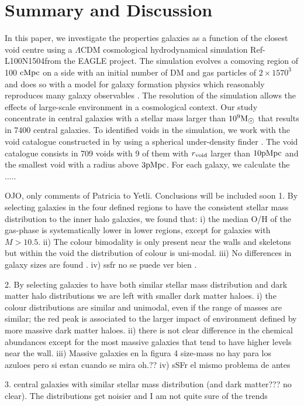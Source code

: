 \documentclass[a4paper,fleqn,usenatbib,letter]{mnras}
\newcommand{\Msun}{\rm M_{\sun}}
\newcommand{\pMpc}{\rm pMpc}
\newcommand{\REF}{Ref-L100N1504}
\newcommand{\Rvoid}{r_{\rm void} }
\begin{document}
\section{ Summary and Discussion}
In this paper, we investigate the properties galaxies as a function of the closest void centre using a  $\Lambda$CDM  cosmological hydrodynamical simulation \REF from the EAGLE project.  The simulation evolves a comoving region of 100 $\rm cMpc$ on a side with  an initial number of  DM and gas  particles  of $2\times 1570^3$ and does so with a model for galaxy formation physics which reasonably reproduces  many galaxy observables \citep{schaye2015,crain2015,furlong2015}.  
The resolution of the simulation allows the effects of large-scale environment in a cosmological context. Our study concentrate in central galaxies with a stellar mass larger than $10^9 \Msun$ that results in 7400 central galaxies. To identified voids in the simulation, we  work with the void catalogue constructed in \cite*{paillas2017} by using a spherical under-density finder \citep{padilla2005}. The void catalogue consists in 709 voids with 9 of them with $\Rvoid$ larger than $10\pMpc$ and the smallest void with a radius above $3\pMpc$. 
For each galaxy, we calculate the .....  
 

OJO, only comments of Patricia to Yetli. Conclusions will be included soon
1. By selecting galaxies in the four defined regions to have the consistent stellar mass distribution to the inner halo galaxies,
we found that:
i) the median O/H of the gas-phase is systematically lower in lower regions, except for galaxies with $M > 10.5$.
ii) The colour bimodality is only present near the walls and skeletons but within the void the distribution of colour is uni-modal.
iii) No differences in galaxy sizes are found .
iv) ssfr no se puede ver bien .

2. By selecting galaxies to have both similar stellar mass distribution and dark matter halo distributions we are left with smaller
dark matter haloes.
i) the colour distributions are similar and unimodal, even if the range of masses are similar; the red peak is associated to the larger impact of
environment defined by more massive dark matter haloes.
ii) there is not clear difference in the chemical abundances except for the most massive galaxies that tend to have higher levels near the wall.
iii) Massive galaxies en la figura 4 size-mass no hay  para los azuloes  pero si estan cuando se mira oh.??
iv) sSFr el mismo problema de antes

3. central galaxies with similar stellar mass distribution (and dark matter??? no clear).
The distributions get noisier and I am not quite sure of the trends
\end{document}
